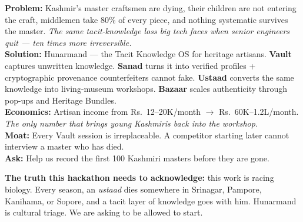\documentclass[11pt, a4paper]{article}
\begin{document}
\begin{insightbox}
\textbf{Problem:} Kashmir's master craftsmen are dying, their children are not entering the craft, middlemen take 80\% of every piece, and nothing systematic survives the master. \textit{The same tacit-knowledge loss big tech faces when senior engineers quit --- ten times more irreversible.}\\[4pt]
\textbf{Solution:} Hunarmand --- the Tacit Knowledge OS for heritage artisans. \textbf{Vault} captures unwritten knowledge. \textbf{Sanad} turns it into verified profiles + cryptographic provenance counterfeiters cannot fake. \textbf{Ustaad} converts the same knowledge into living-museum workshops. \textbf{Bazaar} scales authenticity through pop-ups and Heritage Bundles.\\[4pt]
\textbf{Economics:} Artisan income from Rs.\ 12--20K/month $\to$ Rs.\ 60K--1.2L/month. \textit{The only number that brings young Kashmiris back into the workshop.}\\[4pt]
\textbf{Moat:} Every Vault session is irreplaceable. A competitor starting later cannot interview a master who has died.\\[4pt]
\textbf{Ask:} Help us record the first 100 Kashmiri masters before they are gone.
\end{insightbox}

\begin{warnbox}
\textbf{The truth this hackathon needs to acknowledge:} this work is racing biology. Every season, an {\itshape ustaad} dies somewhere in Srinagar, Pampore, Kanihama, or Sopore, and a tacit layer of knowledge goes with him. Hunarmand is cultural triage. We are asking to be allowed to start.
\end{warnbox}

\vspace{0.4em}
\end{document}
